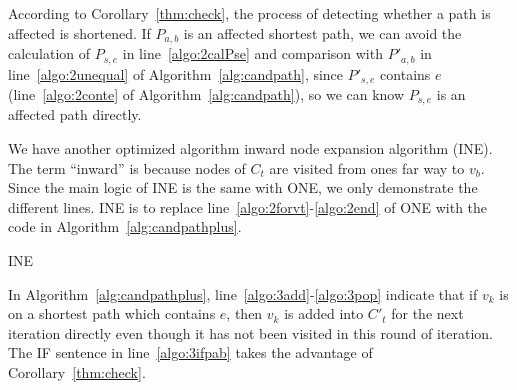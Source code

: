 According to Corollary~\ref{thm:check}, the process of detecting whether a path is affected is shortened. If $P_{a,b}$ is an affected shortest path, we can avoid the calculation of $P_{s,e}$ in line~\ref{algo:2calPse} and comparison with $P'_{a,b}$ in line~\ref{algo:2unequal} of Algorithm~\ref{alg:candpath}, since $P'_{s,e}$ contains $e$ (line~\ref{algo:2conte} of Algorithm~\ref{alg:candpath}), so we can know $P_{s,e}$ is an affected path directly.

We have another optimized algorithm inward node expansion algorithm (INE). The term ``inward'' is because nodes of $C_t$ are visited from ones far way to $v_b$.
Since the main logic of INE is the same with ONE, we only demonstrate the different lines. INE is to replace line~\ref{algo:2forvt}-\ref{algo:2end} of ONE with the code in Algorithm~\ref{alg:candpathplus}.



\begin{algorithm}[htbp]
{\small
     \caption{{\textsc{INE}} }
    \label{alg:candpathplus}
}
\end{algorithm}

In Algorithm~\ref{alg:candpathplus}, line~\ref{algo:3add}-\ref{algo:3pop} indicate that if $v_k$ is on a shortest path which contains $e$, then $v_k$ is added into $C'_t$ for the next iteration directly even though it has not been visited in this round of iteration. The IF sentence in line~\ref{algo:3ifpab} takes the advantage of Corollary~\ref{thm:check}.



